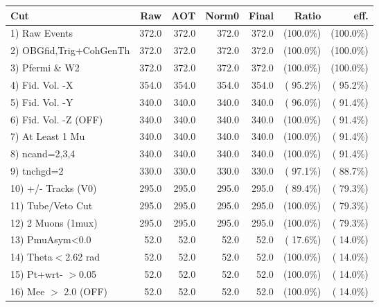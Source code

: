  \begin{table}[h!]\centering
 \begin{tabular}{||l||r|r|r|r|r|r||}
 \hline
 \hline
 Cut & Raw & AOT & Norm0 & Final & Ratio & eff.       \\
 \hline
  1) Raw Events           &        372.0 &        372.0 &        372.0 &        372.0 & (100.0\%) & (100.0\%) \\
  2) OBGfid,Trig+CohGenTh &        372.0 &        372.0 &        372.0 &        372.0 & (100.0\%) & (100.0\%) \\
  3) Pfermi \& W2         &        372.0 &        372.0 &        372.0 &        372.0 & (100.0\%) & (100.0\%) \\
  4) Fid. Vol. -X         &        354.0 &        354.0 &        354.0 &        354.0 & ( 95.2\%) & ( 95.2\%) \\
  5) Fid. Vol. -Y         &        340.0 &        340.0 &        340.0 &        340.0 & ( 96.0\%) & ( 91.4\%) \\
  6) Fid. Vol. -Z (OFF)   &        340.0 &        340.0 &        340.0 &        340.0 & (100.0\%) & ( 91.4\%) \\
  7) At Least 1 Mu        &        340.0 &        340.0 &        340.0 &        340.0 & (100.0\%) & ( 91.4\%) \\
  8) ncand=2,3,4          &        340.0 &        340.0 &        340.0 &        340.0 & (100.0\%) & ( 91.4\%) \\
  9) tnchgd=2             &        330.0 &        330.0 &        330.0 &        330.0 & ( 97.1\%) & ( 88.7\%) \\
 10) +/- Tracks (V0)      &        295.0 &        295.0 &        295.0 &        295.0 & ( 89.4\%) & ( 79.3\%) \\
 11) Tube/Veto Cut        &        295.0 &        295.0 &        295.0 &        295.0 & (100.0\%) & ( 79.3\%) \\
 12) 2 Muons (1mux)       &        295.0 &        295.0 &        295.0 &        295.0 & (100.0\%) & ( 79.3\%) \\
 13) PmuAsym<0.0          &         52.0 &         52.0 &         52.0 &         52.0 & ( 17.6\%) & ( 14.0\%) \\
 14) Theta$<$2.62 rad     &         52.0 &         52.0 &         52.0 &         52.0 & (100.0\%) & ( 14.0\%) \\
 15) Pt+wrt- $>$0.05      &         52.0 &         52.0 &         52.0 &         52.0 & (100.0\%) & ( 14.0\%) \\
 16) Mee $>$ 2.0  (OFF)   &         52.0 &         52.0 &         52.0 &         52.0 & (100.0\%) & ( 14.0\%) \\

\end{tabular}
\end{table}
